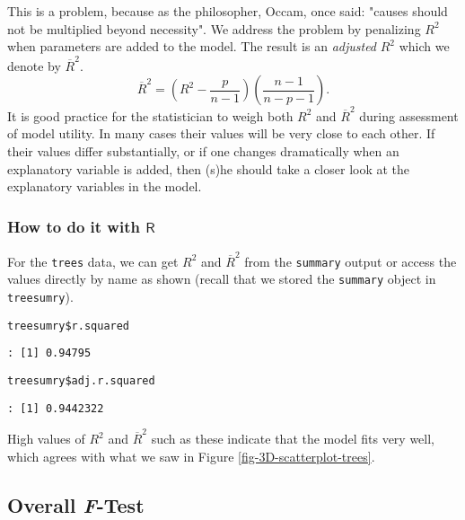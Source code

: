 This is a problem, because as the philosopher, Occam, once said:
"causes should not be multiplied beyond necessity". We address the
problem by penalizing \(R^{2}\) when parameters are added to the
model. The result is an \emph{adjusted} \(R^{2}\) which we denote by
\(\overline{R}^{2}\).
\begin{equation}
\overline{R}^{2}=\left(R^{2}-\frac{p}{n-1}\right)\left(\frac{n-1}{n-p-1}\right).
\end{equation}
It is good practice for the statistician to weigh both \(R^{2}\) and
\(\overline{R}^{2}\) during assessment of model utility. In many cases
their values will be very close to each other. If their values differ
substantially, or if one changes dramatically when an explanatory
variable is added, then (s)he should take a closer look at the
explanatory variables in the model.

\subsubsection{How to do it with \(\mathsf{R}\)}
\label{sec-12-3-1-1}
For the \texttt{trees} data, we can get \(R^{2}\) and \(\overline{R}^{2}\)
from the \texttt{summary} output or access the values directly by name as
shown (recall that we stored the \texttt{summary} object in \texttt{treesumry}).

\begin{verbatim}
treesumry$r.squared
\end{verbatim}

\begin{verbatim}
: [1] 0.94795
\end{verbatim}

\begin{verbatim}
treesumry$adj.r.squared
\end{verbatim}

\begin{verbatim}
: [1] 0.9442322
\end{verbatim}

High values of \(R^{2}\) and \( \overline{R}^2 \) such as these
indicate that the model fits very well, which agrees with what we saw
in Figure \ref{fig-3D-scatterplot-trees}.

\subsection{Overall \emph{F}-Test}
\label{sec-12-3-2}

